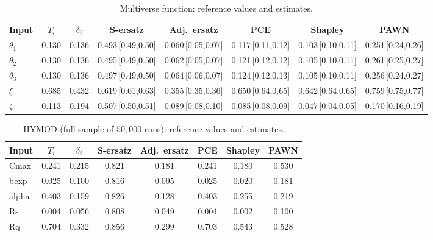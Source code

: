 \documentclass[11pt,a4paper]{article}
\begin{document}
\begin{table}[H]\centering\footnotesize
\begin{tabular}{@{}lccccccc@{}}\toprule
Input & $T_i$ & $\delta_i$ & S-ersatz & Adj.\ ersatz & PCE & Shapley & PAWN \\ \midrule
$\theta_1$ & 0.130 & 0.136 & 0.493\,{\scriptsize[0.49,0.50]} & 0.060\,{\scriptsize[0.05,0.07]} & 0.117\,{\scriptsize[0.11,0.12]} & 0.103\,{\scriptsize[0.10,0.11]} & 0.251\,{\scriptsize[0.24,0.26]} \\
$\theta_2$ & 0.130 & 0.136 & 0.495\,{\scriptsize[0.49,0.50]} & 0.062\,{\scriptsize[0.05,0.07]} & 0.121\,{\scriptsize[0.12,0.12]} & 0.105\,{\scriptsize[0.10,0.11]} & 0.261\,{\scriptsize[0.25,0.27]} \\
$\theta_3$ & 0.130 & 0.136 & 0.497\,{\scriptsize[0.49,0.50]} & 0.064\,{\scriptsize[0.06,0.07]} & 0.124\,{\scriptsize[0.12,0.13]} & 0.105\,{\scriptsize[0.10,0.11]} & 0.256\,{\scriptsize[0.24,0.27]} \\
$\xi$ & 0.685 & 0.432 & 0.619\,{\scriptsize[0.61,0.63]} & 0.355\,{\scriptsize[0.35,0.36]} & 0.650\,{\scriptsize[0.64,0.65]} & 0.642\,{\scriptsize[0.64,0.65]} & 0.759\,{\scriptsize[0.75,0.77]} \\
$\zeta$ & 0.113 & 0.194 & 0.507\,{\scriptsize[0.50,0.51]} & 0.089\,{\scriptsize[0.08,0.10]} & 0.085\,{\scriptsize[0.08,0.09]} & 0.047\,{\scriptsize[0.04,0.05]} & 0.170\,{\scriptsize[0.16,0.19]} \\
\bottomrule\end{tabular}
\caption{Multiverse function: reference values and estimates.}
\label{tab:in6}
\end{table}
\begin{table}[H]\centering\footnotesize
\begin{tabular}{@{}lccccccc@{}}\toprule
Input & $T_i$ & $\delta_i$ & S-ersatz & Adj.\ ersatz & PCE & Shapley & PAWN \\ \midrule
Cmax & 0.241 & 0.215 & 0.821 & 0.181 & 0.241 & 0.180 & 0.530 \\
bexp & 0.025 & 0.100 & 0.816 & 0.095 & 0.025 & 0.020 & 0.181 \\
alpha & 0.403 & 0.159 & 0.826 & 0.128 & 0.403 & 0.255 & 0.219 \\
Rs & 0.004 & 0.056 & 0.808 & 0.049 & 0.004 & 0.002 & 0.100 \\
Rq & 0.704 & 0.332 & 0.856 & 0.299 & 0.703 & 0.543 & 0.528 \\
\bottomrule\end{tabular}
\caption{HYMOD (full sample of $50{,}000$ runs): reference values and estimates.}
\label{tab:in7}
\end{table}
\end{document}
